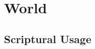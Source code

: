 \section{World}
	\label{WORLD}
	





\subsection{Scriptural Usage} %
	\label{WORLD-SCRIPTURES}

	
	
